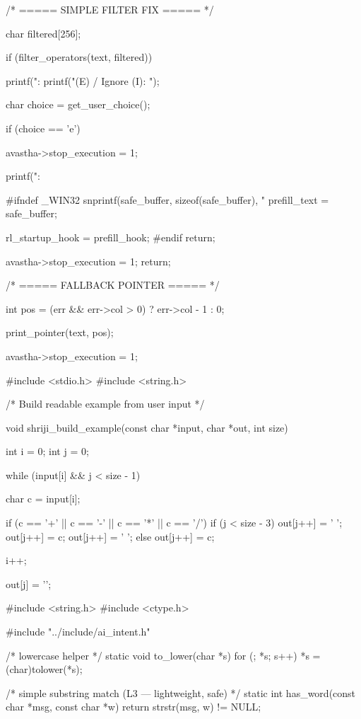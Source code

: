 \documentclass{article}
\begin{document}
{    /* ===== SIMPLE FILTER FIX ===== */

    char filtered[256];

    if (filter_operators(text, filtered))
    {
        printf("\nSuggestion: %
        printf("\nEdit (E) / Ignore (I): ");

        char choice = get_user_choice();

        if (choice == 'e')
        {
            avastha->stop_execution = 1;

            printf("\nEdit:\n%

#ifndef _WIN32
            snprintf(safe_buffer, sizeof(safe_buffer), "%
            prefill_text = safe_buffer;

            rl_startup_hook = prefill_hook;
#endif
            return;
        }

        avastha->stop_execution = 1;
        return;
    }

    /* ===== FALLBACK POINTER ===== */

    int pos = (err && err->col > 0) ? err->col - 1 : 0;

    print_pointer(text, pos);

    avastha->stop_execution = 1;
}
#include <stdio.h>
#include <string.h>

/*
    Build readable example from user input
*/

void shriji_build_example(const char *input, char *out, int size)
{
    int i = 0;
    int j = 0;

    while (input[i] && j < size - 1)
    {
        char c = input[i];

        if (c == '+' || c == '-' || c == '*' || c == '/')
        {
            if (j < size - 3)
            {
                out[j++] = ' ';
                out[j++] = c;
                out[j++] = ' ';
            }
        }
        else
        {
            out[j++] = c;
        }

        i++;
    }

    out[j] = '\0';
}
#include <string.h>
#include <ctype.h>

#include "../include/ai_intent.h"

/* lowercase helper */
static void to_lower(char *s)
{
    for (; *s; s++)
        *s = (char)tolower(*s);
}

/* simple substring match (L3 — lightweight, safe) */
static int has_word(const char *msg, const char *w)
{
    return strstr(msg, w) != NULL;
}
\end{document}
